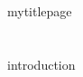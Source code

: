 \documentclass[11pt]{article} %
\begin{document}
{mytitlepage}


\singlespacing %
\renewcommand\contentsname{Table of Contents}
\tableofcontents{}
\doublespacing
\newpage



\ifdefined\Introduction
  \section*{\Introduction}
  \label{intro}
  {introduction}
\fi
\end{document}
